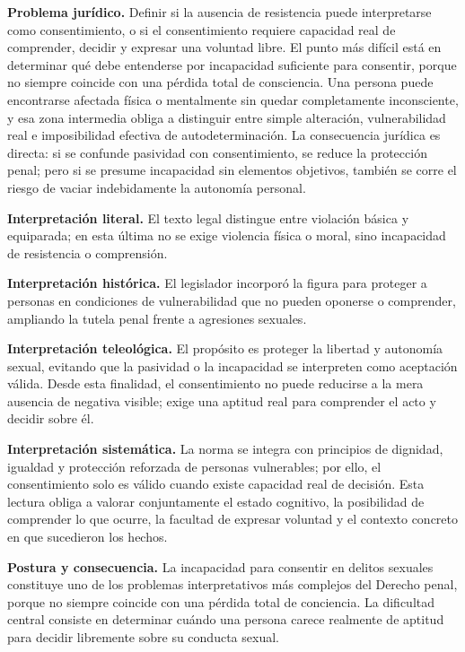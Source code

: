 \documentclass[
	spanish,
	letterpaper, oneside
]{article}
\begin{document}
\textbf{Problema jurídico.} Definir si la ausencia de resistencia puede interpretarse como consentimiento, o si el consentimiento requiere capacidad real de comprender, decidir y expresar una voluntad libre. El punto más difícil está en determinar qué debe entenderse por incapacidad suficiente para consentir, porque no siempre coincide con una pérdida total de consciencia. Una persona puede encontrarse afectada física o mentalmente sin quedar completamente inconsciente, y esa zona intermedia obliga a distinguir entre simple alteración, vulnerabilidad real e imposibilidad efectiva de autodeterminación. La consecuencia jurídica es directa: si se confunde pasividad con consentimiento, se reduce la protección penal; pero si se presume incapacidad sin elementos objetivos, también se corre el riesgo de vaciar indebidamente la autonomía personal.

\textbf{Interpretación literal.} El texto legal distingue entre violación básica y equiparada; en esta última no se exige violencia física o moral, sino incapacidad de resistencia o comprensión.

\textbf{Interpretación histórica.} El legislador incorporó la figura para proteger a personas en condiciones de vulnerabilidad que no pueden oponerse o comprender, ampliando la tutela penal frente a agresiones sexuales.

\textbf{Interpretación teleológica.} El propósito es proteger la libertad y autonomía sexual, evitando que la pasividad o la incapacidad se interpreten como aceptación válida. Desde esta finalidad, el consentimiento no puede reducirse a la mera ausencia de negativa visible; exige una aptitud real para comprender el acto y decidir sobre él.

\textbf{Interpretación sistemática.} La norma se integra con principios de dignidad, igualdad y protección reforzada de personas vulnerables; por ello, el consentimiento solo es válido cuando existe capacidad real de decisión. Esta lectura obliga a valorar conjuntamente el estado cognitivo, la posibilidad de comprender lo que ocurre, la facultad de expresar voluntad y el contexto concreto en que sucedieron los hechos.

\textbf{Postura y consecuencia.} La incapacidad para consentir en delitos sexuales constituye uno de los problemas interpretativos más complejos del Derecho penal, porque no siempre coincide con una pérdida total de conciencia. La dificultad central consiste en determinar cuándo una persona carece realmente de aptitud para decidir libremente sobre su conducta sexual.
\end{document}
